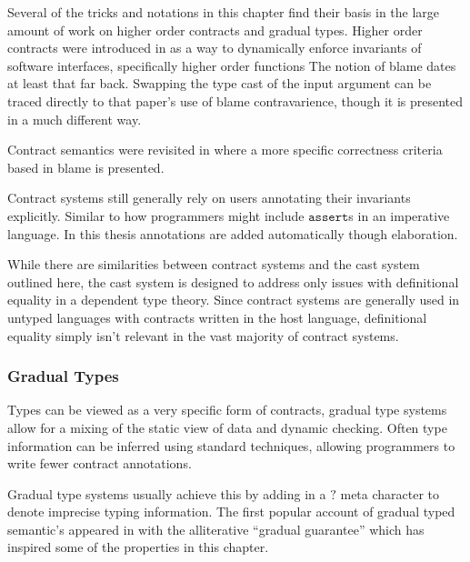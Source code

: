 Several of the tricks and notations in this chapter find their basis
in the large amount of work on higher order contracts and gradual
types. Higher order contracts were introduced in \cite{10.1145/581478.581484}
as a way to dynamically enforce invariants of software interfaces,
specifically higher order functions%
The notion of blame dates at least that far back. Swapping the type
cast of the input argument can be traced directly to that paper's
use of blame contravarience, though it is presented in a much different
way. %

Contract semantics were revisited in \cite{10.1145/1925844.1926410,10.1007/978-3-642-28869-2_11}
where a more specific correctness criteria based in blame is presented.

Contract systems still generally rely on users annotating their invariants
explicitly. Similar to how programmers might include $\mathtt{assert}$s
in an imperative language. In this thesis annotations are added automatically
though elaboration.

While there are similarities between contract systems and the cast
system outlined here, the cast system is designed to address only
issues with definitional equality in a dependent type theory. Since
contract systems are generally used in untyped languages with contracts
written in the host language, definitional equality simply isn't relevant
in the vast majority of contract systems.

\subsubsection{Gradual Types}

Types can be viewed as a very specific form of contracts, gradual
type systems allow for a mixing of the static view of data and dynamic
checking. Often type information can be inferred using standard techniques,
allowing programmers to write fewer contract annotations. %

Gradual type systems usually achieve this by adding in a $?$ meta
character to denote imprecise typing information. The first popular
account of gradual typed semantic's appeared in \cite{siek_et_al:LIPIcs:2015:5031}
with the alliterative ``gradual guarantee'' which has inspired some
of the properties in this chapter.

